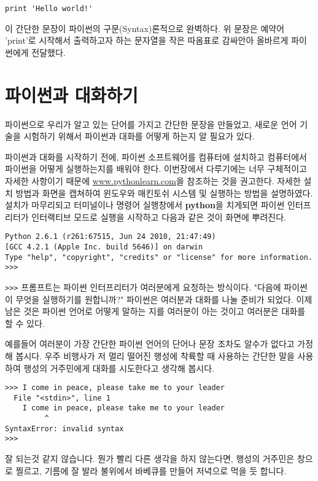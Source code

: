 \beforeverb
\begin{verbatim}
print 'Hello world!'
\end{verbatim}
\afterverb

이 간단한 문장이 파이썬의 구문(Syntax)론적으로 완벽하다. 위 문장은 예약어 'print'로 시작해서 출력하고자 하는 문자열을 작은 따옴표로 감싸안아 올바르게 파이썬에게 전달했다.

\section{파이썬과 대화하기}

파이썬으로 우리가 알고 있는 단어를 가지고 간단한 문장을 만들었고, 새로운 언어 기술을 시험하기 위해서 파이썬과 대화를 어떻게 하는지 알 필요가 있다.

파이썬과 대화를 시작하기 전에, 파이썬 소프트웨어를 컴퓨터에 설치하고 컴퓨터에서 파이썬을 어떻게 실행하는지를 배워야 한다. 이번장에서 다루기에는 너무 구체적이고 자세한 사항이기 때문에 \url{www.pythonlearn.com}을 참조하는 것을 권고한다. 자세한 설치 방법과 화면을 캡쳐하여 윈도우와 매킨토쉬 시스템 및 실행하는 방법을 설명하였다. 설치가 마무리되고 터미널이나 명령어 실행창에서 {\bf python}을 치게되면 파이썬 인터프리터가 인터랙티브 모드로 실행을 시작하고 다음과 같은 것이 화면에 뿌려진다.


\beforeverb
\begin{verbatim}
Python 2.6.1 (r261:67515, Jun 24 2010, 21:47:49) 
[GCC 4.2.1 (Apple Inc. build 5646)] on darwin
Type "help", "copyright", "credits" or "license" for more information.
>>> 
\end{verbatim}
\afterverb
%
{\tt >>>} 프롬프트는 파이썬 인터프리터가 여러분에게 요청하는 방식이다. "다음에 파이썬이 무엇을 실행하기를 원합니까?" 파이썬은 여러분과 대화를 나눌 준비가 되었다. 이제 남은 것은 파이썬 언어로 어떻게 말하는 지를 여러분이 아는 것이고 여러분은 대화를 할 수 있다.

예를들어 여러분이 가장 간단한 파이썬 언어의 단어나 문장 조차도 알수가 없다고 가정해 봅시다. 우주 비행사가 저 멀리 떨어진 행성에 착륙할 때 사용하는 간단한 말을 사용하여 행성의 거주민에게 대화를 시도한다고 생각해 봅시다.

\beforeverb
\begin{verbatim}
>>> I come in peace, please take me to your leader
  File "<stdin>", line 1
    I come in peace, please take me to your leader
         ^
SyntaxError: invalid syntax
>>> 
\end{verbatim}
\afterverb
%
잘 되는것 같지 않습니다. 뭔가 빨리 다른 생각을 하지 않는다면, 행성의 거주민은 창으로 찔르고, 기름에 잘 발라 불위에서 바베큐를 만들어 저녁으로 먹을 듯 합니다.

